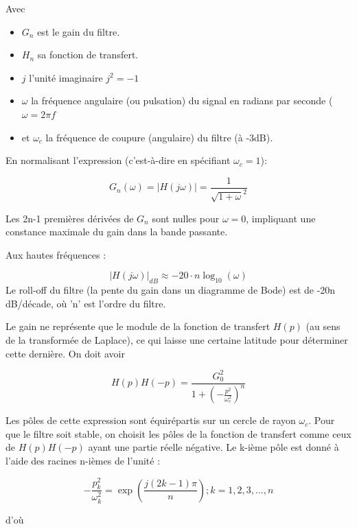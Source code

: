 \documentclass[conference,onecolumn]{IEEEtran}
\begin{document}
Avec
\begin{itemize}
    \item[] $G_n$ est le gain du filtre.
    \item[] $H_n$ sa fonction de transfert.
    \item[] $j$ l'unité imaginaire $j^2 = -1$
    \item[] $\omega$ la fréquence angulaire (ou pulsation) du signal en radians par seconde ($\omega = 2\pi f$
    \item[] et $\omega_c$ la fréquence de coupure (angulaire) du filtre (à -3dB).
\end{itemize}
En normalisant l'expression (c’est-à-dire en spécifiant $\omega_c = 1$):

\begin{equation}
    G_n(\omega) = |H(j\omega)| = \frac{1}{\sqrt{1 + \omega}^2}
\end{equation}

Les 2n-1 premières dérivées de $G_n$ sont nulles pour $\omega = 0$, impliquant une constance maximale du gain dans la bande passante.

Aux hautes fréquences :

\begin{equation}
    |H(j\omega)|_{dB} \approx -20 \cdot n\log_{10}(\omega)
\end{equation}
Le roll-off du filtre (la pente du gain dans un diagramme de Bode) est de -20n dB/décade, où 'n' est l'ordre du filtre.

Le gain ne représente que le module de la fonction de transfert $H(p)$ (au sens de la transformée de Laplace), ce qui laisse une certaine latitude pour déterminer cette dernière. On doit avoir

\begin{equation}
    H(p)H(-p) = \frac{G_0^2}{1 + (-\frac{p^2}{\omega_c^2})^n}
\end{equation}

Les pôles de cette expression sont équirépartis sur un cercle de rayon  $\omega_c$. Pour que le filtre soit stable, on choisit les pôles de la fonction de transfert comme ceux de $H(p)H(-p)$ ayant une partie réelle négative. Le k-ième pôle est donné à l'aide des racines n-ièmes de l'unité :

\begin{equation}
    -\frac{p_k^2}{\omega_k^2} = \exp({\frac{j(2k - 1)\pi}{n}}); k = 1,2,3,...,n
\end{equation}
    

d'où
\end{document}
